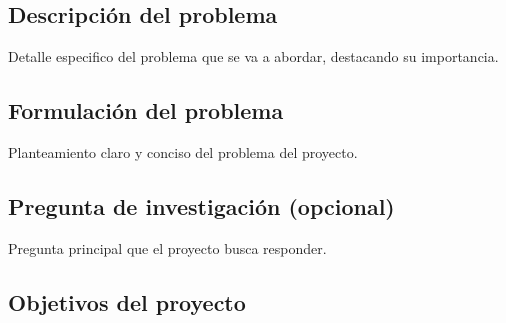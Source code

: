 \documentclass[12pt,letterpaper]{report}
\begin{document}
	\subsection{Descripción del problema}
	Detalle especifico del problema que se va a abordar, destacando su importancia.
	\subsection{Formulación del problema}
	Planteamiento claro y conciso del problema del proyecto.
	\subsection{Pregunta de investigación (opcional)}
	Pregunta principal que el proyecto busca responder.
	\subsection{Objetivos del proyecto}
\end{document}
